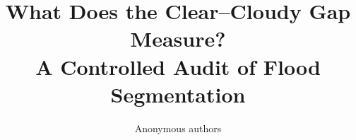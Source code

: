 \documentclass[10pt,twocolumn,letterpaper]{article}
\title{What Does the Clear--Cloudy Gap Measure?\\A Controlled Audit of Flood Segmentation}
\author{Anonymous authors}
\begin{document}
\maketitle





{\small


}
\end{document}
